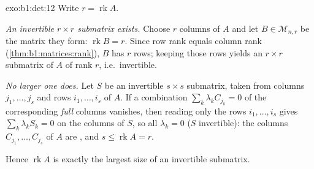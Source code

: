 \begin{solution}{exo:b1:det:12}
Write $r = \operatorname{rk} A$.

\emph{An invertible $r \times r$ submatrix exists.} Choose $r$
 columns of $A$ and let $B \in \mathcal{M}_{n,r}$ be the
matrix they form: $\operatorname{rk} B = r$. Since row rank
equals column rank (\cref{thm:b1:matrices:rank}), $B$ has $r$
 rows; keeping those rows yields an $r \times r$ submatrix
of $A$ of rank $r$, i.e.\ invertible.

\emph{No larger one does.} Let $S$ be an invertible $s \times s$
submatrix, taken from columns $j_1, \dots, j_s$ and rows $i_1,
\dots, i_s$ of $A$. If a combination $\sum_k \lambda_k
C_{j_k} = 0$ of the corresponding \emph{full} columns vanishes,
then reading only the rows $i_1, \dots, i_s$ gives $\sum_k
\lambda_k S_k = 0$ on the columns of $S$, so all $\lambda_k = 0$
($S$ invertible): the columns $C_{j_1}, \dots, C_{j_s}$ of $A$
are , and $s \leq \operatorname{rk} A = r$.

Hence $\operatorname{rk} A$ is exactly the largest size of an
invertible submatrix.
\end{solution}

